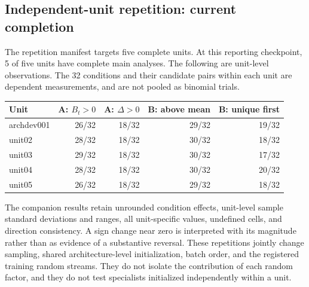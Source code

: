 \subsection{Independent-unit repetition: current completion}
\label{sec:independent-repetition-status}
The repetition manifest targets five complete units. At this reporting checkpoint, 5 of five units have complete main analyses.
The following are unit-level observations. The 32 conditions and their candidate pairs within each unit are dependent measurements, and are not pooled as binomial trials.
\begin{center}\small
\begin{tabular}{lrrrr}
Unit & A: $B_t>0$ & A: $\Delta>0$ & B: above mean & B: unique first\\\hline
archdev001 & 26/32 & 18/32 & 29/32 & 19/32\\
unit02 & 28/32 & 18/32 & 30/32 & 18/32\\
unit03 & 29/32 & 18/32 & 30/32 & 17/32\\
unit04 & 28/32 & 18/32 & 30/32 & 20/32\\
unit05 & 26/32 & 18/32 & 29/32 & 18/32\\
\end{tabular}\end{center}
The companion results retain unrounded condition effects, unit-level sample standard deviations and ranges, all unit-specific values, undefined cells, and direction consistency. A sign change near zero is interpreted with its magnitude rather than as evidence of a substantive reversal.
These repetitions jointly change sampling, shared architecture-level initialization, batch order, and the registered training random streams. They do not isolate the contribution of each random factor, and they do not test specialists initialized independently within a unit.

